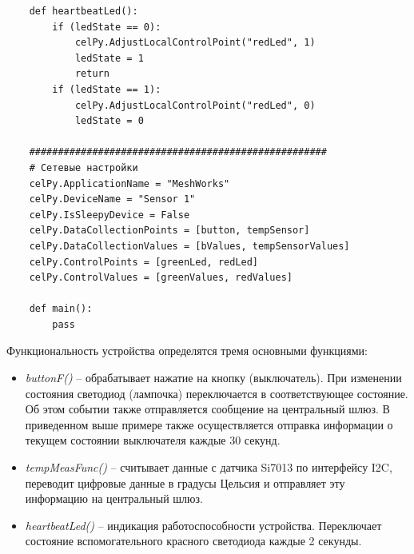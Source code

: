 \documentclass[12pt]{article}
\begin{document}
\begin{verbatim}
    def heartbeatLed(): 
        if (ledState == 0): 
            celPy.AdjustLocalControlPoint("redLed", 1)
            ledState = 1
            return
        if (ledState == 1): 
            celPy.AdjustLocalControlPoint("redLed", 0)
            ledState = 0
      
    ####################################################
    # Сетевые настройки
    celPy.ApplicationName = "MeshWorks"  
    celPy.DeviceName = "Sensor 1" 
    celPy.IsSleepyDevice = False
    celPy.DataCollectionPoints = [button, tempSensor] 
    celPy.DataCollectionValues = [bValues, tempSensorValues]
    celPy.ControlPoints = [greenLed, redLed]
    celPy.ControlValues = [greenValues, redValues] 
      
    def main(): 
        pass
\end{verbatim}

Функциональность устройства определятся тремя основными функциями:
\begin{itemize}
    \item \emph{buttonF()} -- обрабатывает нажатие на кнопку (выключатель). При 
    изменении состояния светодиод (лампочка) переключается в соответствующее состояние.
    Об этом событии также отправляется сообщение на центральный шлюз. В приведенном
    выше примере также осуществляется отправка информации о текущем состоянии выключателя
    каждые 30 секунд.
    \item \emph{tempMeasFunc()} -- считывает данные с датчика
    Si7013 по интерфейсу I2C, переводит цифровые данные в градусы Цельсия и 
    отправляет эту информацию на центральный шлюз.
    \item \emph{heartbeatLed()} -- индикация работоспособности устройства. Переключает
    состояние вспомогательного красного светодиода каждые 2 секунды.
\end{itemize}
\end{document}
